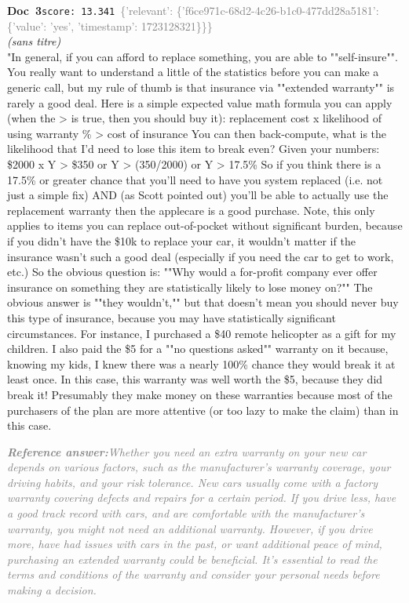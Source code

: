 \documentclass[a4paper,11pt]{article}
\begin{document}
\begin{docenv}
{\footnotesize\textcolor{doccolor}{\textbf{Doc~3}}}\hfill{\tiny\texttt{score:~13.341}}\ {\tiny\textcolor{gray}{\{'relevant': \{'f6ce971c-68d2-4c26-b1c0-477dd28a5181': \{'value': 'yes', 'timestamp': 1723128321\}\}\}}}\\[3pt]
{\small\textit{(sans titre)}}\\[2pt]
\vspace{2pt}
{\footnotesize 
"In general, if you can afford to replace something, you are able to ""self-insure"". You really want to understand a little of the statistics before you can make a generic call, but my rule of thumb is that insurance via ""extended warranty"" is rarely a good deal. Here is a simple expected value math formula you can apply (when the > is true, then you should buy it): replacement cost x likelihood of using warranty \% > cost of insurance You can then back-compute, what is the likelihood that I'd need to lose this item to break even? Given your numbers: \$2000 x Y > \$350 or Y > (350/2000) or Y > 17.5\% So if you think there is a 17.5\% or greater chance that you'll need to have you system replaced (i.e. not just a simple fix) AND (as Scott pointed out) you'll be able to actually use the replacement warranty then the applecare is a good purchase. Note, this only applies to items you can replace out-of-pocket without significant burden, because if you didn't have the \$10k to replace your car, it wouldn't matter if the insurance wasn't such a good deal (especially if you need the car to get to work, etc.) So the obvious question is: ""Why would a for-profit company ever offer insurance on something they are statistically likely to lose money on?"" The obvious answer is ""they wouldn't,"" but that doesn't mean you should never buy this type of insurance, because you may have statistically significant circumstances. For instance, I purchased a \$40 remote helicopter as a gift for my children. I also paid the \$5 for a ""no questions asked"" warranty on it because, knowing my kids, I knew there was a nearly 100\% chance they would break it at least once. In this case, this warranty was well worth the \$5, because they did break it! Presumably they make money on these warranties because most of the purchasers of the plan are more attentive (or too lazy to make the claim) than in this case.}
\end{docenv}
\begin{refanswerenv}
{\footnotesize\textit{\textcolor{gray}{\textbf{Reference answer:}\enspace Whether you need an extra warranty on your new car depends on various factors, such as the manufacturer's warranty coverage, your driving habits, and your risk tolerance. New cars usually come with a factory warranty covering defects and repairs for a certain period. If you drive less, have a good track record with cars, and are comfortable with the manufacturer's warranty, you might not need an additional warranty. However, if you drive more, have had issues with cars in the past, or want additional peace of mind, purchasing an extended warranty could be beneficial. It's essential to read the terms and conditions of the warranty and consider your personal needs before making a decision.}}}
\end{refanswerenv}
\end{document}
